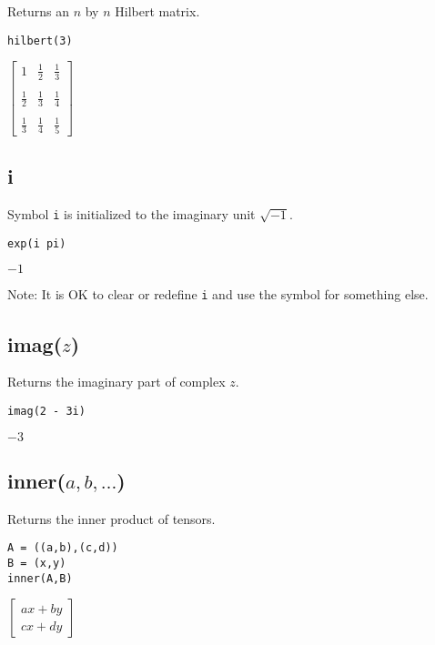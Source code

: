 Returns an $n$ by $n$ Hilbert matrix.

{\color{blue}
\begin{verbatim}
hilbert(3)
\end{verbatim}
}

\noindent
$\displaystyle
\begin{bmatrix}
1 & \tfrac{1}{2} & \tfrac{1}{3}\\ \\
\tfrac{1}{2} & \tfrac{1}{3} & \tfrac{1}{4}\\ \\
\tfrac{1}{3} & \tfrac{1}{4} & \tfrac{1}{5}
\end{bmatrix}
$

\subsection*{i}

Symbol {\tt i} is initialized to the imaginary unit $\sqrt{-1}$.

{\color{blue}
\begin{verbatim}
exp(i pi)
\end{verbatim}
}

\noindent
$-1$

\bigskip
\noindent
Note: It is OK to clear or redefine {\tt i} and use the symbol for something else.

\subsection*{imag($z$)}

Returns the imaginary part of complex $z$.

{\color{blue}
\begin{verbatim}
imag(2 - 3i)
\end{verbatim}
}

\noindent
$-3$

\subsection*{inner($a,b,\ldots$)}

Returns the inner product of tensors.

{\color{blue}
\begin{verbatim}
A = ((a,b),(c,d))
B = (x,y)
inner(A,B)
\end{verbatim}
}

\noindent
$\displaystyle
\begin{bmatrix}
ax+by\\
cx+dy
\end{bmatrix}
$

